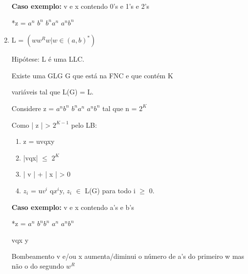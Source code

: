 \begin{question}
\begin{enumerate}[label=\textbf{\alph*})]
        \textbf{Caso exemplo:} v e x contendo 0's e 1's e 2's

        *z = $a^n$ $b^n$ $b^na^n$ $a^nb^n$

        \item 
        
        L = $(ww^{R}w | w \in (a,b)^{*} )$

        Hipótese: L é uma LLC.
    
        Existe uma GLG G que está na FNC e que contém K 
    
        variáveis tal que L(G) = L.
    
        Considere z = $a^nb^n$ $b^na^n$ $a^nb^n$ tal que n = $2^K$
    
        Como | z | > $2^{K-1}$ pelo LB:
    
        \begin{enumerate}[label=\textbf{\arabic*})]
            \item z = uvqxy 
            \item |vqx| $\leq$ $2^K$
            \item | v | + | x | > 0
            \item  $z_i$ = u$v^i$ q$x^i$y, $z_i$ $\in$ L(G) para todo i $\geq$ 0.
        \end{enumerate}

        \textbf{Caso exemplo:} v e x contendo a's e b's

        *z = $a^n$ $b^nb^n$ $a^n$ $a^nb^n$

        vqx y

        Bombeamento v e/ou x aumenta/diminui o número de a's do 
        primeiro w mas não o do segundo $w^R$

    \end{enumerate}

\end{question}

